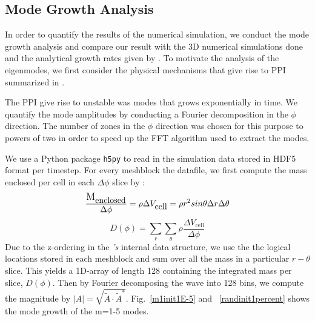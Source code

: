 \documentclass[iop,revtex4]{emulateapj}
\begin{document}
\subsection{Mode Growth Analysis}
\par In order to quantify the results of the numerical simulation, we conduct the mode growth analysis and compare our result with the 3D numerical simulations done \cite{Hawley:1991A} and the analytical growth rates given by \cite{Goldreich:1986A}. To motivate the analysis of the eigenmodes, we first consider the physical mechanisms that give rise to \ac{PPI} summarized in \cite{Narayan:1989A}.
\par The \ac{PPI} give rise to unstable was modes that grows exponentially in time. We quantify the mode amplitudes by conducting a Fourier decomposition in the $\phi$ direction. The number of zones in the $\phi$ direction was chosen for this purpose to powers of two in order to speed up the \ac{FFT} algorithm used to extract the modes. 
\par We use a Python package \texttt{h5py} to read in the simulation data stored in HDF5 format per timestep. For every meshblock the datafile, we first compute the mass enclosed per cell in each $\Delta\phi$ slice by :
\begin{equation}
\frac{\mbox{\large M}_{\mbox{enclosed}}}{\Delta\phi} = \rho\Delta V_{\mbox{cell}} = \rho r^2 sin\theta \Delta r \Delta\theta
\end{equation}
\begin{equation}
D(\phi) = \sum_r \sum_\theta \rho \frac{\Delta V_{\mbox{cell}}}{\Delta\phi}
\end{equation}
Due to the z-ordering in the \app\textit{'s} internal data structure, we use the the logical locations stored in each meshblock and sum over all the mass in a particular $r-\theta$ slice. This yields a 1D-array of length 128 containing the integrated mass per slice, $D(\phi)$. Then by Fourier decomposing the wave into 128 bins, we compute the magnitude by $|A|=\sqrt{\tilde{A}\cdot \tilde{A}^*}$. Fig.~\ref{m1init1E-5} and ~\ref{randinit1percent} shows the mode growth of the m=1-5 modes. 
\end{document}
